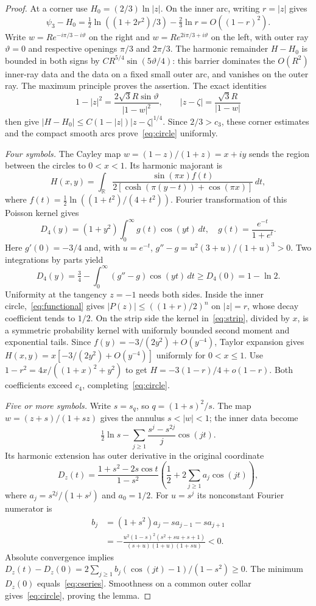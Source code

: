 \documentclass[12pt,letterpaper,onecolumn]{article}
\newcommand{\R}{\mathbb R}
\begin{document}
\begin{proof}
At a corner use $H_0=(2/3)\ln|z|$. On the inner arc, writing $r=|z|$ gives
\[
\psi_3-H_0=\tfrac12\ln((1+2r^2)/3)-\tfrac23\ln r=O((1-r)^2).
\]
Write $w=Re^{-i\pi/3-i\vartheta}$ on the right and $w=Re^{2i\pi/3+i\vartheta}$ on the left, with outer ray $\vartheta=0$ and respective openings $\pi/3$ and $2\pi/3$. The harmonic remainder $H-H_0$ is bounded in both signs by $CR^{5/4}\sin(5\vartheta/4)$: this barrier dominates the $O(R^2)$ inner-ray data and the data on a fixed small outer arc, and vanishes on the outer ray. The maximum principle proves the assertion. The exact identities
\[
1-|z|^2=\frac{2\sqrt3R\sin\vartheta}{|1-w|^2},\qquad
|z-\zeta|=\frac{\sqrt3R}{|1-w|}
\]
then give $|H-H_0|\le C(1-|z|)|z-\zeta|^{1/4}$. Since $2/3>c_3$, these corner estimates and the compact smooth arcs prove~\eqref{eq:circle} uniformly.

\emph{Four symbols.}
The Cayley map $w=(1-z)/(1+z)=x+iy$ sends the region between the circles to $0<x<1$. Its harmonic majorant is
\begin{equation}\label{eq:strip}
H(x,y)=\int_{\R}
\frac{\sin(\pi x)f(t)}{2[\cosh(\pi(y-t))+\cos(\pi x)]}\,dt,
\end{equation}
where $f(t)=\tfrac12\ln((1+t^2)/(4+t^2))$.
Fourier transformation of this Poisson kernel gives
\[
D_4(y)=(1+y^2)\int_0^\infty g(t)\cos(yt)\,dt,
\quad g(t)=\frac{e^{-t}}{1+e^t}.
\]
Here $g'(0)=-3/4$ and, with $u=e^{-t}$,
$g''-g=u^2(3+u)/(1+u)^3>0$. Two integrations by parts yield
\[
D_4(y)=\tfrac34-\int_0^\infty(g''-g)\cos(yt)\,dt
\ge D_4(0)=1-\ln2.
\]
Uniformity at the tangency $z=-1$ needs both sides. Inside the inner circle,~\eqref{eq:functional} gives
$|P(z)|\le((1+r)/2)^n$ on $|z|=r$, whose decay coefficient tends to $1/2$. On the strip side the kernel in~\eqref{eq:strip}, divided by $x$, is a symmetric probability kernel with uniformly bounded second moment and exponential tails. Since $f(y)=-3/(2y^2)+O(y^{-4})$, Taylor expansion gives
$H(x,y)=x[-3/(2y^2)+O(y^{-4})]$ uniformly for $0<x\le1$.
Use $1-r^2=4x/((1+x)^2+y^2)$ to get
$H=-3(1-r)/4+o(1-r)$. Both coefficients exceed $c_4$, completing~\eqref{eq:circle}.

\emph{Five or more symbols.}
Write $s=s_q$, so $q=(1+s)^2/s$. The map
$w=(z+s)/(1+sz)$ gives the annulus $s<|w|<1$; the inner data become
\[
\tfrac12\ln s-\sum_{j\ge1}\frac{s^j-s^{2j}}j\cos(jt).
\]
Its harmonic extension has outer derivative in the original coordinate
\begin{equation}\label{eq:annulusD}
D_z(t)=\frac{1+s^2-2s\cos t}{1-s^2}
\left(\frac12+2\sum_{j\ge1}a_j\cos(jt)\right),
\end{equation}
where $a_j=s^{2j}/(1+s^j)$ and $a_0=1/2$.
For $u=s^j$ its nonconstant Fourier numerator is
\begin{align*}
b_j&=(1+s^2)a_j-sa_{j-1}-sa_{j+1}\\
&=-\frac{u^2(1-s)^2(s^2+su+s+1)}{(s+u)(1+u)(1+su)}<0.
\end{align*}
Absolute convergence implies
$D_z(t)-D_z(0)=2\sum_{j\ge1}b_j(\cos(jt)-1)/(1-s^2)\ge0$.
The minimum $D_z(0)$ equals~\eqref{eq:cseries}. Smoothness on a common outer collar gives~\eqref{eq:circle}, proving the lemma.
\end{proof}
\end{document}
